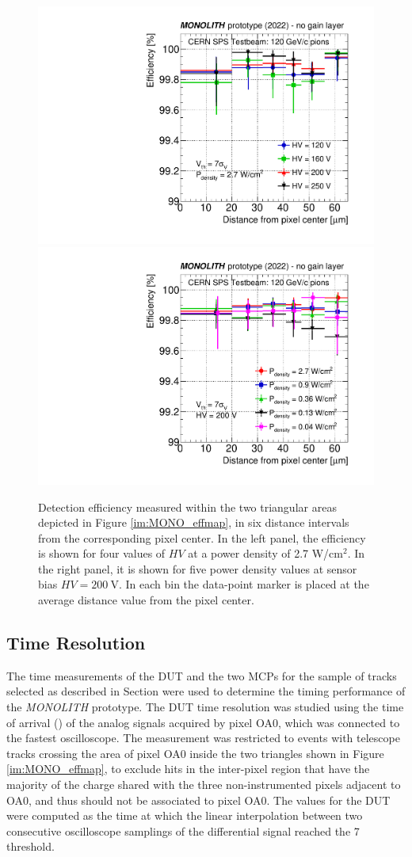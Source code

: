 		\begin{figure}[h]
			\centering 
			\includegraphics[width=.49\textwidth,trim=0 0 0 0]{files/MONOLITH_paper/eff_vs_radius_HV.pdf}
			\includegraphics[width=.49\textwidth,trim=0 0 0 0]{files/MONOLITH_paper/eff_vs_radius_power.pdf}
			\caption{Detection efficiency measured within the two triangular areas depicted in Figure \ref{im:MONO_effmap}, in six distance intervals from the corresponding pixel center. In the left panel, the  efficiency is shown for four values of $HV$ at a power density of 2.7 W/cm$^2$. In the right panel, it is shown for five power density values at sensor bias $HV=\SI{200}{\volt}$.  In each bin the data-point marker is placed at the average distance value from the pixel center.}
			\label{im:MONO_eff_radius} 
		\end{figure}

		\subsection{Time Resolution}	

		The time measurements of the DUT and the two MCPs for the sample of tracks selected as described in Section  were used to determine the timing performance of the \textit{MONOLITH} prototype. 
		The DUT time resolution was studied using the time of arrival (\toa) of the  analog signals acquired by pixel OA0, which was connected to the fastest oscilloscope. The measurement was restricted to events with telescope tracks crossing the area of pixel OA0 inside the two triangles shown in Figure \ref{im:MONO_effmap}, to exclude hits in the inter-pixel region that have the majority of the charge shared with the three non-instrumented pixels adjacent to OA0, and thus should not be associated to pixel OA0. 
		The \toa values for the DUT were computed as the time at which the linear interpolation between two consecutive oscilloscope samplings of the differential signal reached the 7 \noise threshold. 
		
